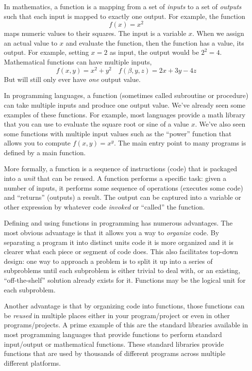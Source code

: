 
\label{chapter:functions}


In mathematics, a function is a mapping from a set of \emph{inputs}
to a set of \emph{outputs} such that each input is mapped to exactly one
output.  For example, the function 
  $$f(x) = x^2$$
maps numeric values to their squares.  The input is a variable $x$.  When
we assign an actual value to $x$ and evaluate the function, then the function
has a value, its output.  For example, setting $x = 2$ as input, the output
would be $2^2 = 4$.  Mathematical functions can have multiple inputs, 
  $$f(x,y) = x^2 + y^2 \quad f(\beta, y, z) = 2x + 3y - 4z$$
But will still only ever have \emph{one} output value.

In programming languages, a \gls{function} (sometimes called subroutine 
or procedure) can take multiple inputs and produce one output value.  We've 
already seen some examples of these functions.  For example, most languages 
provide a math library that you can use to evaluate the square root or 
sine of a value $x$.  We've also seen some functions with multiple input 
values such as the ``power'' function that allows you to compute $f(x, y) = x^y$.
The main entry point to many programs is defined by a main function.

More formally, a function is a sequence of instructions (code) that is 
packaged into a \emph{unit} that can be reused.  A function performs 
a specific task: given a number of inputs, it performs some sequence 
of operations (executes some code) and ``returns'' (outputs) a result.
The output can be captured into a variable or other expression by 
whatever code \emph{invoked} or ``called'' the function.

Defining and using functions in programming has numerous advantages.
The most obvious advantage is that it allows you a way to \emph{organize} 
code.  By separating a program it into distinct units code it is more organized 
and it is clearer what each piece or segment of code does.  This also 
facilitates \gls{top-down design}: one way to approach a problem is to 
split it up into a series of subproblems until each subproblem is either trivial 
to deal  with, or an existing, ``off-the-shelf'' solution already exists for it.
Functions may be the logical unit for each subproblem.  

Another advantage is that by organizing code into functions, those functions 
can be \emph{reused} in multiple places either in your program/project 
or even in other programs/projects.  A prime example of this are the standard
libraries available in most programming languages that provide functions
to perform standard input/output or mathematical functions.  These standard
libraries provide functions that are used by thousands of different programs
across multiple different platforms.

